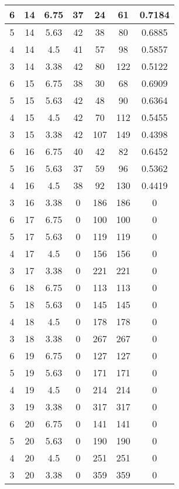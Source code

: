 \documentclass[letterpaper, 12pt]{article}
\begin{document}
\begin{longtable}{|c|c|c|c|c|c|c|}
6 & 14 & 6.75 & 37 & 24 & 61 & 0.7184 \\
\hline
5 & 14 & 5.63 & 42 & 38 & 80 & 0.6885 \\
\hline
4 & 14 & 4.5 & 41 & 57 & 98 & 0.5857 \\
\hline
3 & 14 & 3.38 & 42 & 80 & 122 & 0.5122 \\
\hline
6 & 15 & 6.75 & 38 & 30 & 68 & 0.6909 \\
\hline
5 & 15 & 5.63 & 42 & 48 & 90 & 0.6364 \\
\hline
4 & 15 & 4.5 & 42 & 70 & 112 & 0.5455 \\
\hline
3 & 15 & 3.38 & 42 & 107 & 149 & 0.4398 \\
\hline
6 & 16 & 6.75 & 40 & 42 & 82 & 0.6452 \\
\hline
5 & 16 & 5.63 & 37 & 59 & 96 & 0.5362 \\
\hline
4 & 16 & 4.5 & 38 & 92 & 130 & 0.4419 \\
\hline
3 & 16 & 3.38 & 0 & 186 & 186 & 0 \\
\hline
6 & 17 & 6.75 & 0 & 100 & 100 & 0 \\
\hline
5 & 17 & 5.63 & 0 & 119 & 119 & 0 \\
\hline
4 & 17 & 4.5 & 0 & 156 & 156 & 0 \\
\hline
3 & 17 & 3.38 & 0 & 221 & 221 & 0 \\
\hline
6 & 18 & 6.75 & 0 & 113 & 113 & 0 \\
\hline
5 & 18 & 5.63 & 0 & 145 & 145 & 0 \\
\hline
4 & 18 & 4.5 & 0 & 178 & 178 & 0 \\
\hline
3 & 18 & 3.38 & 0 & 267 & 267 & 0 \\
\hline
6 & 19 & 6.75 & 0 & 127 & 127 & 0 \\
\hline
5 & 19 & 5.63 & 0 & 171 & 171 & 0 \\
\hline
4 & 19 & 4.5 & 0 & 214 & 214 & 0 \\
\hline
3 & 19 & 3.38 & 0 & 317 & 317 & 0 \\
\hline
6 & 20 & 6.75 & 0 & 141 & 141 & 0 \\
\hline
5 & 20 & 5.63 & 0 & 190 & 190 & 0 \\
\hline
4 & 20 & 4.5 & 0 & 251 & 251 & 0 \\
\hline
3 & 20 & 3.38 & 0 & 359 & 359 & 0 \\
\hline
\end{longtable}
\end{document}
